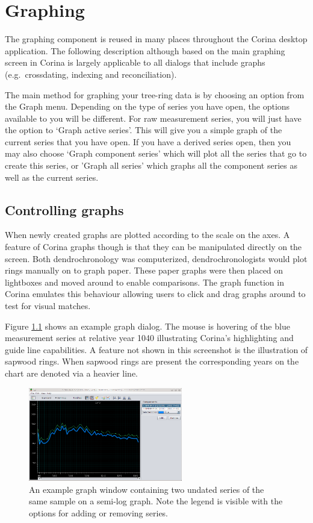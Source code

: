 \chapter{Graphing}

The graphing component is reused in many places throughout the Corina desktop application.  The following description although based on the main graphing screen in Corina is largely applicable to all dialogs that include graphs (e.g.\ crossdating, indexing and reconciliation).  

The main method for graphing your tree-ring data is by choosing an option from the Graph menu.  Depending on the type of series you have open, the options available to you will be different.  For raw measurement series, you will just have the option to `Graph active series'.  This will give you a simple graph of the current series that you have open.  If you have a derived series open, then you may also choose `Graph component series' which will plot all the series that go to create this series, or 'Graph all series' which graphs all the component series as well as the current series.

\section{Controlling graphs}

When newly created graphs are plotted according to the scale on the axes.  A feature of Corina graphs though is that they can be manipulated directly on the screen.  Both dendrochronology was computerized, dendrochronologists would plot rings manually on to graph paper.  These paper graphs were then placed on lightboxes and moved around to enable comparisons.  The graph function in Corina emulates this behaviour allowing users to click and drag graphs around to test for visual matches.

Figure \ref{fig:graph} shows an example graph dialog.  The mouse is hovering of the blue measurement series at relative year 1040 illustrating Corina's highlighting and guide line capabilities.  A feature not shown in this screenshot is the illustration of sapwood rings.  When sapwood rings are present the corresponding years on the chart are denoted via a heavier line.

\begin{figure}
  \centering
    \includegraphics[width=0.6\textwidth]{Images/graph.png}
    \caption{An example graph window containing two undated series of the same sample on a semi-log graph.  Note the legend is visible with the options for adding or removing series.}
    \label{fig:graph}
\end{figure}


